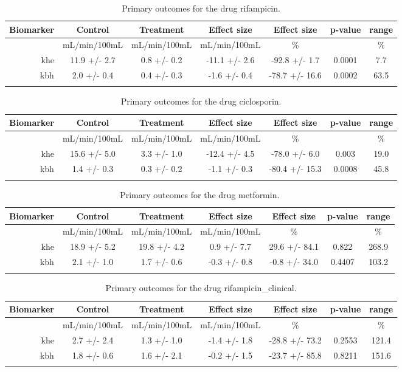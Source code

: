 \documentclass{epflreport}%
\begin{document}
%
\begin{longtable}{rcccccc}%
\hline%
Biomarker&Control&Treatment&Effect size&Effect size&p{-}value&range\\%
\hline%
&mL/min/100mL&mL/min/100mL&mL/min/100mL&\%&&\%\\%
khe&11.9 +/{-} 2.7&0.8 +/{-} 0.2&{-}11.1 +/{-} 2.6&{-}92.8 +/{-} 1.7&0.0001&7.7\\%
kbh&2.0 +/{-} 0.4&0.4 +/{-} 0.3&{-}1.6 +/{-} 0.4&{-}78.7 +/{-} 16.6&0.0002&63.5\\%
\hline%
\caption{Primary outcomes for the drug rifampicin.} \\%
\end{longtable}%
\begin{longtable}{rcccccc}%
\hline%
Biomarker&Control&Treatment&Effect size&Effect size&p{-}value&range\\%
\hline%
&mL/min/100mL&mL/min/100mL&mL/min/100mL&\%&&\%\\%
khe&15.6 +/{-} 5.0&3.3 +/{-} 1.0&{-}12.4 +/{-} 4.5&{-}78.0 +/{-} 6.0&0.003&19.0\\%
kbh&1.4 +/{-} 0.3&0.3 +/{-} 0.2&{-}1.1 +/{-} 0.3&{-}80.4 +/{-} 15.3&0.0008&45.8\\%
\hline%
\caption{Primary outcomes for the drug ciclosporin.} \\%
\end{longtable}%
\begin{longtable}{rcccccc}%
\hline%
Biomarker&Control&Treatment&Effect size&Effect size&p{-}value&range\\%
\hline%
&mL/min/100mL&mL/min/100mL&mL/min/100mL&\%&&\%\\%
khe&18.9 +/{-} 5.2&19.8 +/{-} 4.2&0.9 +/{-} 7.7&29.6 +/{-} 84.1&0.822&268.9\\%
kbh&2.1 +/{-} 1.0&1.7 +/{-} 0.6&{-}0.3 +/{-} 0.8&{-}0.8 +/{-} 34.0&0.4407&103.2\\%
\hline%
\caption{Primary outcomes for the drug metformin.} \\%
\end{longtable}%
\begin{longtable}{rcccccc}%
\hline%
Biomarker&Control&Treatment&Effect size&Effect size&p{-}value&range\\%
\hline%
&mL/min/100mL&mL/min/100mL&mL/min/100mL&\%&&\%\\%
khe&2.7 +/{-} 2.4&1.3 +/{-} 1.0&{-}1.4 +/{-} 1.8&{-}28.8 +/{-} 73.2&0.2553&121.4\\%
kbh&1.8 +/{-} 0.6&1.6 +/{-} 2.1&{-}0.2 +/{-} 1.5&{-}23.7 +/{-} 85.8&0.8211&151.6\\%
\hline%
\caption{Primary outcomes for the drug rifampicin\_clinical.} \\%
\end{longtable}%
\clearpage%
\end{document}

